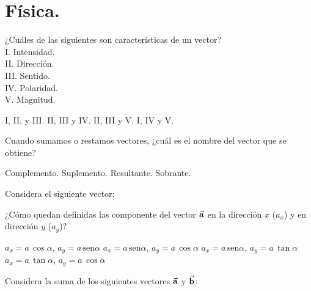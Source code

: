 \documentclass[14pt]{exam}
\begin{document}
\newpage

\section{Física.}

\begin{questions}
    \question ¿Cuáles de las siguientes son características de un vector?
    \\[0.5em]
    I. Intensidad. \\
    II. Dirección. \\
    III. Sentido. \\
    IV. Polaridad. \\
    V. Magnitud. \\[0.5em]
    \begin{oneparchoices}
        \choice I, II, y III.
        \choice II, III y IV.
        \choice II, III y V.
        \choice I, IV y V.
    \end{oneparchoices}
    \question Cuando sumamos o restamos vectores, ¿cuál es el nombre del vector que se obtiene?
    \\[0.5em]
    \begin{oneparchoices}
        \choice Complemento.
        \choice Suplemento.
        \choice Resultante.
        \choice Sobrante.
    \end{oneparchoices}
    \question Considera el siguiente vector:
    \begin{figure}[H]
        \centering
    \end{figure}
    ¿Cómo quedan definidas las componente del vector $\va{a}$ en la dirección $x$ ($a_{x}$) y en dirección $y$ ($a_{y}$)?
    \begin{choices}
        \choice $a_{x} = a \, \cos \alpha$, $a_{y} = a \, \text{sen} \alpha$
        \choice $a_{x} = a \, \text{sen} \alpha$, $a_{y} = a \, \cos \alpha$
        \choice $a_{x} = a \, \text{sen} \alpha$, $a_{y} = a \, \tan \alpha$
        \choice $a_{x} = a \, \tan \alpha$, $a_{y} = a \, \cos \alpha$
    \end{choices}
    \question Considera la suma de los siguientes vectores $\va{a}$ y $\va{b}$:

\end{questions}
\end{document}

